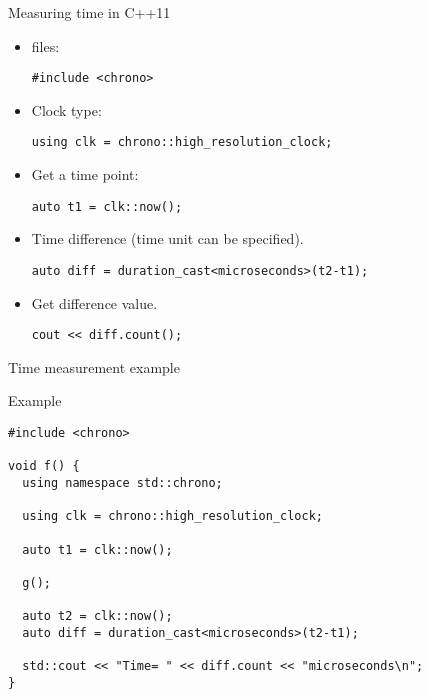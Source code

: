 \begin{frame}[t,fragile]{Measuring time in C++11}
\begin{itemize}

\item {} files:
\begin{lstlisting}
#include <chrono>
\end{lstlisting}

\item Clock type:
\begin{lstlisting}
using clk = chrono::high_resolution_clock;
\end{lstlisting}

\item Get a time point:
\begin{lstlisting}
auto t1 = clk::now();
\end{lstlisting}

\item Time difference (time unit can be specified).
\begin{lstlisting}
auto diff = duration_cast<microseconds>(t2-t1);
\end{lstlisting}

\item Get difference value.
\begin{lstlisting}
cout << diff.count();
\end{lstlisting}

\end{itemize}
\end{frame}

\begin{frame}[t,fragile]{Time measurement example}
\begin{block}{Example}
\begin{lstlisting}
#include <chrono>

void f() {
  using namespace std::chrono;

  using clk = chrono::high_resolution_clock;

  auto t1 = clk::now();

  g();

  auto t2 = clk::now();
  auto diff = duration_cast<microseconds>(t2-t1);

  std::cout << "Time= " << diff.count << "microseconds\n";
}
\end{lstlisting}
\end{block}
\end{frame}

